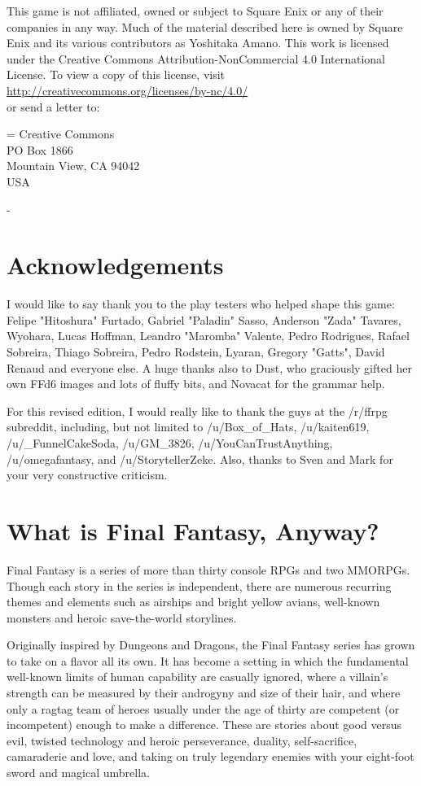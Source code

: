 \begin{multicols}{2}
This game is not affiliated, owned or subject to
Square Enix or any of their companies in any way.
Much of the material described here is owned by
Square Enix and its various contributors as Yoshitaka
Amano. This work is licensed under the Creative
Commons Attribution-NonCommercial 4.0 International
License. To view a copy of this license, visit\\
\url{http://creativecommons.org/licenses/by-nc/4.0/}\\
or send a letter to:

\hangindent=\parindent
Creative Commons\\
PO Box 1866\\
Mountain View, CA 94042\\
USA


- \ferrum
\end{multicols}
\newpage

\begin{multicols}{2}
\section*{Acknowledgements}
I would like to say thank you to the play
testers who helped shape this game: Felipe
"Hitoshura" Furtado, Gabriel "Paladin" Sasso,
Anderson "Zada" Tavares, Wyohara, Lucas
Hoffman, Leandro "Maromba" Valente, Pedro
Rodrigues, Rafael Sobreira, Thiago Sobreira, Pedro
Rodstein, Lyaran, Gregory "Gatts", David Renaud
and everyone else. A huge thanks also to Dust,
who graciously gifted her own FFd6 images and
lots of fluffy bits, and Novacat for the grammar
help. \pw

For this revised edition, I would really like to thank the guys at the /r/ffrpg subreddit, including, but not limited to /u/Box\_of\_Hats, /u/kaiten619, /u/\_FunnelCakeSoda, /u/GM\_3826, /u/YouCanTrustAnything, /u/omegafantasy, and /u/StorytellerZeke. Also, thanks to Sven and Mark for your very constructive criticism.

\section*{What is Final Fantasy, Anyway?}
Final Fantasy is a series of more than thirty
console RPGs and two MMORPGs. Though each
story in the series is independent, there are
numerous recurring themes and elements such as
airships and bright yellow avians, well-known
monsters and heroic save-the-world storylines.

Originally inspired by Dungeons and
Dragons, the Final Fantasy series has grown to
take on a flavor all its own. It has become a setting
in which the fundamental well-known limits of
human capability are casually ignored, where a
villain’s strength can be measured by their
androgyny and size of their hair, and where only a
ragtag team of heroes usually under the age of
thirty are competent (or incompetent) enough to
make a difference. These are stories about good
versus evil, twisted technology and heroic
perseverance, duality, self-sacrifice, camaraderie
and love, and taking on truly legendary enemies
with your eight-foot sword and magical umbrella.
\end{multicols}